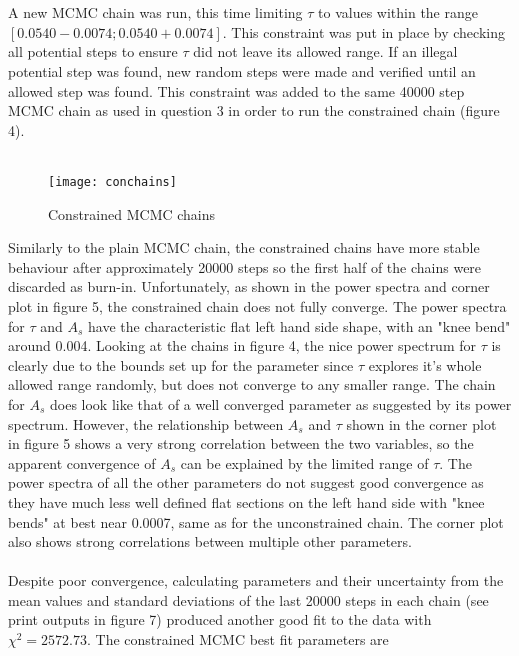 \documentclass{article}
\newcommand{\<}[1]{\left\langle #1 \right\rangle }
\begin{document}
\section{}
A new MCMC chain was run, this time limiting $\tau$ to values within the range $[0.0540 - 0.0074; 0.0540 + 0.0074]$. This constraint was put in place by checking all potential steps to ensure $\tau$ did not leave its allowed range. If an illegal potential step was found, new random steps were made and verified until an allowed step was found. This constraint was added to the same 40000 step MCMC chain as used in question 3 in order to run the constrained chain (figure 4).\\
\\
\begin{figure}[h]
	\caption{Constrained MCMC chains}
	\centering
	\texttt{[image: conchains]}
\end{figure}
Similarly to the plain MCMC chain, the constrained chains have more stable behaviour after approximately 20000 steps so the first half of the chains were discarded as burn-in. Unfortunately, as shown in the power spectra and corner plot in figure 5, the constrained chain does not fully converge. The power spectra for $\tau$ and $A_s$ have the characteristic flat left hand side shape, with an "knee bend" around 0.004. Looking at the chains in figure 4, the nice power spectrum for $\tau$ is clearly due to the bounds set up for the parameter since $\tau$ explores it's whole allowed range randomly, but does not converge to any smaller range. The chain for $A_s$ does look like that of a well converged parameter as suggested by its power spectrum. However, the relationship between $A_s$ and $\tau$ shown in the corner plot in figure 5 shows a very strong correlation between the two variables, so the apparent convergence of $A_s$ can be explained by the limited range of $\tau$. The power spectra of all the other parameters do not suggest good convergence as they have much less well defined flat sections on the left hand side with "knee bends" at best near 0.0007, same as for the unconstrained chain. The corner plot also shows strong correlations between multiple other parameters.\\
\\
Despite poor convergence, calculating parameters and their uncertainty from the mean values and standard deviations of the last 20000 steps in each chain (see print outputs in figure 7) produced another good fit to the data with $\chi^2 = 2572.73$. The constrained MCMC best fit parameters are
\end{document}
